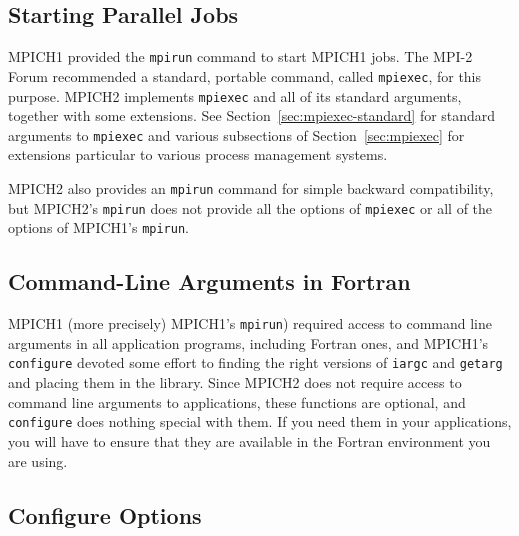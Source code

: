 \documentclass[dvipdfm,11pt]{article}
\begin{document}
\subsection{Starting Parallel Jobs}
\label{sec:startup}

MPICH1 provided the \texttt{mpirun} command to start MPICH1 jobs.  The
MPI-2 Forum recommended a standard, portable command, called
\texttt{mpiexec}, for this purpose.  MPICH2 implements \texttt{mpiexec}
and all of its standard arguments, together with some extensions.  See
Section~\ref{sec:mpiexec-standard} for standard arguments to
\texttt{mpiexec} and various subsections of Section~\ref{sec:mpiexec}
for extensions particular to various process management systems.

MPICH2 also provides an \texttt{mpirun} command for simple backward
compatibility, but MPICH2's \texttt{mpirun} does not provide all the
options of \texttt{mpiexec} or all of the options of MPICH1's
\texttt{mpirun}. 


\subsection{Command-Line Arguments in Fortran}
\label{sec:fortran-command-line}

MPICH1 (more precisely) MPICH1's \texttt{mpirun}) required access to
command line arguments in all application programs, including Fortran
ones, and MPICH1's \texttt{configure} devoted some effort to finding the
right versions of \texttt{iargc} and \texttt{getarg} and placing them in
the library.  Since MPICH2 does not require access to command line
arguments to applications, these functions are optional, and
\texttt{configure} does nothing special with them.  If you need them in
your applications, you will have to ensure that they are available in
the Fortran environment you are using.


\subsection{Configure Options}
\label{sec:configure-options}
\end{document}
